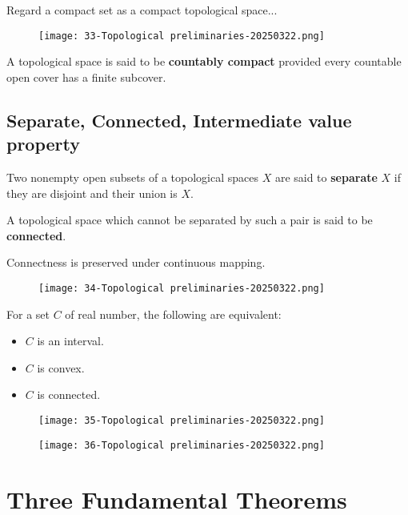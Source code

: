 Regard a compact set as a compact topological space...
\begin{figure}[H]
\centering
\texttt{[image: 33-Topological preliminaries-20250322.png]}
\label{}
\end{figure}

\begin{definition}
A topological space is said to be \textbf{countably compact} provided every countable open cover has a finite subcover.
\end{definition}
\subsection{Separate, Connected, Intermediate value property}

\begin{definition}[separate]
Two nonempty open subsets of a topological spaces $X$ are said to \textbf{separate} $X$ if they are disjoint and their union is $X$.
\end{definition}
\begin{definition}[connected]
A topological space which cannot be separated by such a pair is said to be \textbf{connected}.
\end{definition}
Connectness is preserved under continuous mapping.
\begin{figure}[H]
\centering
\texttt{[image: 34-Topological preliminaries-20250322.png]}
\label{}
\end{figure}

For a set $C$ of real number, the following are equivalent:

\begin{itemize}
	\item $C$ is an interval.
	\item $C$ is convex.
	\item $C$ is connected.
\end{itemize}

\begin{figure}[H]
\centering
\texttt{[image: 35-Topological preliminaries-20250322.png]}
\label{}
\end{figure}
\begin{figure}[H]
\centering
\texttt{[image: 36-Topological preliminaries-20250322.png]}
\label{}
\end{figure}

\section{Three Fundamental Theorems}
